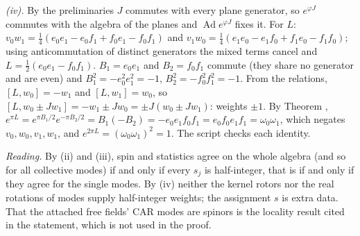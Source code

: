 \emph{(iv).} By the preliminaries $J$ commutes with every plane generator, so $e^{\varphi J}$ commutes with the algebra of the planes and $\operatorname{Ad}e^{\varphi J}$ fixes it. For $L$: $v_{0}w_{1} = \tfrac14(e_{0}e_{1} - e_{0}f_{1} + f_{0}e_{1} - f_{0}f_{1})$ and $v_{1}w_{0} = \tfrac14(e_{1}e_{0} - e_{1}f_{0} + f_{1}e_{0} - f_{1}f_{0})$; using anticommutation of distinct generators the mixed terms cancel and $L = \tfrac12(e_{0}e_{1} - f_{0}f_{1})$. $B_{1} = e_{0}e_{1}$ and $B_{2} = f_{0}f_{1}$ commute (they share no generator and are even) and $B_{1}^{2} = -e_{0}^{2}e_{1}^{2} = -1$, $B_{2}^{2} = -f_{0}^{2}f_{1}^{2} = -1$. From the relations, $[L, w_{0}] = -w_{1}$ and $[L, w_{1}] = w_{0}$, so $[L, w_{0} \pm Jw_{1}] = -w_{1} \pm Jw_{0} = \pm J(w_{0} \pm Jw_{1})$: weights $\pm1$. By Theorem , $e^{\pi L} = e^{\pi B_{1}/2}e^{-\pi B_{2}/2} = B_{1}(-B_{2}) = -e_{0}e_{1}f_{0}f_{1} = e_{0}f_{0}e_{1}f_{1} = \omega_{0}\omega_{1}$, which negates $v_{0}, w_{0}, v_{1}, w_{1}$, and $e^{2\pi L} = (\omega_{0}\omega_{1})^{2} = 1$. The script checks each identity.

\emph{Reading.} By (ii) and (iii), spin and statistics agree on the whole algebra (and so for all collective modes) if and only if every $s_{j}$ is half-integer, that is if and only if they agree for the single modes. By (iv) neither the kernel rotors nor the real rotations of modes supply half-integer weights; the assignment $s$ is extra data. That the attached free fields' CAR modes are spinors is the locality result cited in the statement, which is not used in the proof.
